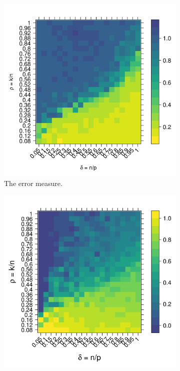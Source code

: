 \documentclass[11pt]{article}
\begin{document}
\begin{figure}[tbhp] 
  \begin{subfigure}[t]{0.5\linewidth}
    \centering
    \includegraphics[totalheight=6cm]{./figs/error_Stodden_FDR.png}
    \caption{The error measure.}
    \label{figure:error_Stodden_FDR.png}
  \end{subfigure} 
  \begin{subfigure}[t]{0.5\linewidth}
    \centering
    \includegraphics[totalheight=6cm]{./figs/rbo_Stodden_FDR.png}

\end{subfigure}
\end{figure}
\end{document}
